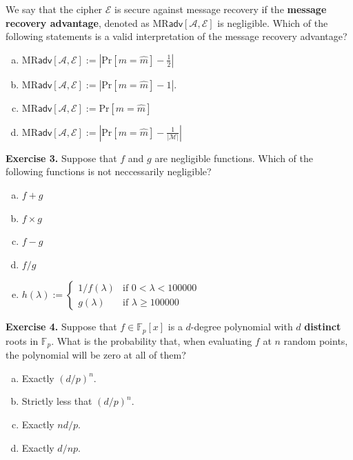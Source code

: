 \documentclass[../lecture-notes.tex]{subfiles}
\begin{document}
We say that the cipher $\mathcal{E}$ is secure against message recovery if the \textbf{message recovery advantage}, denoted as $\text{MR}\textsf{adv}[\mathcal{A}, \mathcal{E}]$ is negligible. Which of the following statements is a valid interpretation of the message recovery advantage?
\begin{enumerate}[a)]
    \item $\text{MR}\textsf{adv}[\mathcal{A},\mathcal{E}] := \left|\text{Pr}[m=\hat{m}] - \frac{1}{2}\right|$
    \item $\text{MR}\textsf{adv}[\mathcal{A},\mathcal{E}] := \left|\text{Pr}[m=\hat{m}] - 1\right|$.
    \item $\text{MR}\textsf{adv}[\mathcal{A},\mathcal{E}] := \text{Pr}[m=\hat{m}]$
    \item $\text{MR}\textsf{adv}[\mathcal{A},\mathcal{E}] := \left|\text{Pr}[m=\hat{m}] - \frac{1}{|\mathcal{M}|}\right|$
\end{enumerate}

\textbf{Exercise 3.} Suppose that $f$ and $g$ are negligible functions. Which of the following functions is not neccessarily negligible?
\begin{enumerate}[a)]
    \item $f + g$
    \item $f \times g$
    \item $f - g$
    \item $f/g$
    \item $h(\lambda) := \begin{cases}
        1/f(\lambda) & \text{if } 0 < \lambda < 100000 \\
        g(\lambda) & \text{if } \lambda \geq 100000
    \end{cases}$
\end{enumerate}

\textbf{Exercise 4.} Suppose that $f \in \mathbb{F}_p[x]$ is a $d$-degree polynomial with $d$ \textbf{distinct} roots in $\mathbb{F}_p$. What is the probability that, when evaluating $f$ at $n$ random points, the polynomial will be zero at all of them?

\begin{enumerate}[a)]
    \item Exactly $(d/p)^n$.
    \item Strictly less that $(d/p)^n$.
    \item Exactly $nd/p$.
    \item Exactly $d/np$.
\end{enumerate}
\end{document}
